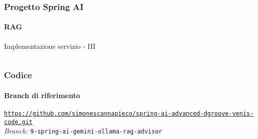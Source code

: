 %
\begin{frame}[t,fragile] \frametitle{Progetto Spring AI}
    \framesubtitle{RAG}
        \begin{block}{Implementazione servizio - III}
			{\tiny\inputminted{java}{code/RAGServiceImpl-3.java}}
    	\end{block}
\end{frame}
%
\begin{frame}[fragile] \frametitle{Codice}
    \framesubtitle{Branch di riferimento}
	\begin{center}
		{\scriptsize \href{https://github.com/simonescannapieco/spring-ai-advanced-dgroove-venis-code.git}{\texttt{https://github.com/simonescannapieco/spring-ai-advanced-dgroove-venis-code.git}}}\\
		\textit{Branch:} \alert{\texttt{9-spring-ai-gemini-ollama-rag-advisor}}
	\end{center}
\end{frame}